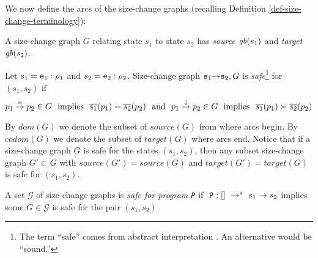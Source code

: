 \documentclass{LMCS}
\newcommand{\cal}{\mathcal}
\newcommand{\fl}{\noindent}
\newcommand{\bdfn}{\begin{defi}}
\newcommand{\edfn}{\end{defi}}
\theoremstyle{definition}\newtheorem{env}[thm]{Environment}
\begin{document}
We now define the arcs of the size-change graphs 
(recalling Definition \ref{def-size-change-terminology}):
\bdfn 
\label{def-graph-arcs}
A size-change graph $G$ relating state $s_1$ to state $s_2$ has {\em source}
${\it gb}(s_1)$ and {\em target}
${\it gb}(s_2)$. 
\edfn


\bdfn\label{def-safe-call-and-evaluation}
Let
$s_1 = {\tt e}_1:\rho_1$ and $s_2 = {\tt e}_2:\rho_2$.
Size-change graph ${\tt s}_1{\to}{\tt s}_2,G$ is 
{\em safe}\footnote{The term ``safe'' comes from abstract interpretation 
\cite{jonesnielson}. An alternative would be  ``sound.''}  
for $(s_1, s_2)$ if
$$
p_1\stackrel{=}{\to}p_2 \in G\mbox{\rm\ \ implies\ \ }
\overline{s_1}(p_1) = \overline{s_2}(p_2){\rm\ \ and\ \ }
p_1\stackrel{\downarrow}{\to}p_2 \in G\mbox{\rm\ \ implies\ \ }
\overline{s_1}(p_1) \succ \overline{s_2}(p_2)
$$
\edfn
\fl
By $dom(G)$ we denote the subset of $source(G)$ from where arcs begin. By $codom(G)$ we denote the subset of $target(G)$ where arcs end.
Notice that if a size-change graph $G$ is safe for the states $(s_1,s_2)$, then any subset size-change graph $G'\subset G$ with $source(G')= source(G)$ and $target(G') = target(G)$ is safe for $(s_1,s_2)$.


\bdfn
\label{safe-set-of-size-change-graphs}
A set $\cal G$ of size-change graphs is 
{\em safe for program {\tt P}} if  
$\ {\tt P}:[]\ \to^*\ s_1\to s_2$ implies some 
$G\in\cal G$ is safe 
for the pair $(s_1,s_2)$.
\edfn
\end{document}
